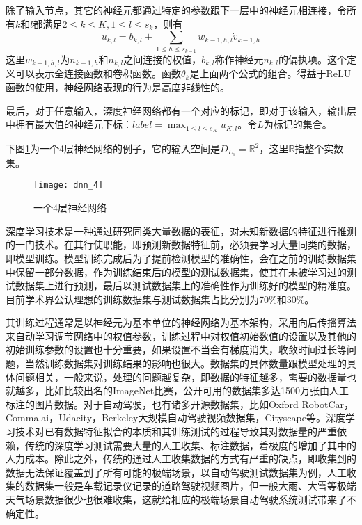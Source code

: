 除了输入节点，其它的神经元都通过特定的参数跟下一层中的神经元相连接，令所有$k$和$l$都满足$2\leq k \leq K, 1\leq l \leq s_k$，则有
$$u_{k,l}=b_{k,l}+\sum_{1\leq h\leq s_{k-1}}w_{k-1,h,l}\dot v_{k-1,h}$$
这里$w_{k-1,h,l}$为$n_{k-1,h}$和$n_{k,l}$之间连接的权值，$b_{k,l}$称作神经元$n_{k,l}$的偏执项。这个定义可以表示全连接函数和卷积函数。函数$\theta_k$是上面两个公式的组合。得益于ReLU函数的使用，神经网络表现的行为是高度非线性的。

最后，对于任意输入，深度神经网络都有一个对应的标记，即对于该输入，输出层中拥有最大值的神经元下标：$label=\max_{1\leq l\leq s_K}u_{K,l}$。令$L$为标记的集合。

下图\ref{fig:dnn}为一个4层神经网络的例子，它的输入空间是$D_{L_1}=\mathbb{R}^2$，这里$\mathbb{R}$指整个实数集。
\begin{figure}[h]
    \centering
    \texttt{[image: dnn\_4]}
    \caption{一个4层神经网络}
    \label{fig:dnn}
\end{figure}

深度学习技术是一种通过研究同类大量数据的表征，对未知新数据的特征进行推测的一门技术。在其行使职能，即预测新数据特征前，必须要学习大量同类的数据，即模型训练。模型训练完成后为了提前检测模型的准确性，会在之前的训练数据集中保留一部分数据，作为训练结束后的模型的测试数据集，使其在未被学习过的测试数据集上进行预测，最后以测试数据集上的准确性作为训练好的模型的精准度。目前学术界公认理想的训练数据集与测试数据集占比分别为70\%和30\%。

其训练过程通常是以神经元为基本单位的神经网络为基本架构，采用向后传播算法来自动学习调节网络中的权值参数，训练过程中对权值初始数值的设置以及其他的初始训练参数的设置也十分重要，如果设置不当会有梯度消失，收敛时间过长等问题，当然训练数据集对训练结果的影响也很大。数据集的具体数量跟模型处理的具体问题相关，一般来说，处理的问题越复杂，即数据的特征越多，需要的数据量也就越多，比如比较出名的ImageNet\cite{ImageNet}比赛，公开可用的数据集多达1500万张由人工标注的图片数据。对于自动驾驶，也有诸多开源数据集，比如Oxford RobotCar\cite{ds:oxford}，Comma.ai\cite{ds:ai}，Udacity\cite{udacity_dataset}，Berkeley大规模自动驾驶视频数据集\cite{ds:berkeley}，Cityscape\cite{Cordts2016Cityscapes}等。深度学习技术对已有数据特征拟合的本质和其训练测试的过程导致其对数据量的严重依赖，传统的深度学习测试需要大量的人工收集、标注数据，着极度的增加了其中的人力成本。除此之外，传统的通过人工收集数据的方式有严重的缺点，即收集到的数据无法保证覆盖到了所有可能的极端场景，以自动驾驶测试数据集为例，人工收集的数据集一般是车载记录仪记录的道路驾驶视频图片，但一般大雨、大雪等极端天气场景数据很少也很难收集，这就给相应的极端场景自动驾驶系统测试带来了不确定性。

